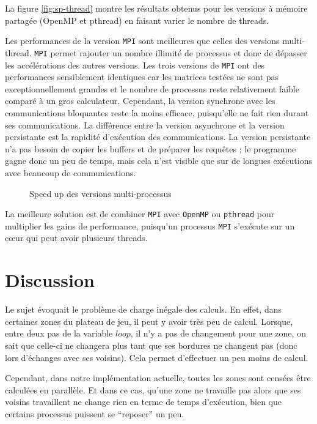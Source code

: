 La figure \ref{fig:sp-thread} montre les résultats obtenus pour les versions à mémoire partagée (OpenMP et pthread) en faisant varier le nombre de threads.


Les performances de la version \texttt{MPI} sont meilleures que celles des versions multi-thread. \texttt{MPI} permet rajouter un nombre illimité de processus et donc de dépasser les accélérations des autres versions. Les trois versions de \texttt{MPI} ont des performances sensiblement identiques car les matrices testées ne sont pas exceptionnellement grandes et le nombre de processus reste relativement faible comparé à un gros calculateur. Cependant, la version synchrone avec les communications bloquantes reste la moins efficace, puisqu'elle ne fait rien durant ses communications. La différence entre la version asynchrone et la version persistante est la rapidité d'exécution des communications. La version persistante n'a pas besoin de copier les buffers et de préparer les requêtes ; le programme gagne donc un peu de temps, mais cela n'est visible que sur de longues exécutions avec beaucoup de communications.

\begin{figure}[!ht]
\centering
\caption{Speed up des versions multi-processus}
\label{fig:sp-proc}
\end{figure}

La meilleure solution est de combiner \texttt{MPI} avec \texttt{OpenMP} ou \texttt{pthread} pour multiplier les gains de performance, puisqu'un processus \texttt{MPI} s'exécute sur un c\oe ur qui peut avoir plusieurs threads.


\section{Discussion} %
\label{sec:discussion}

Le sujet évoquait le problème de charge inégale des calculs. En effet, dans certaines zones du plateau de jeu, il peut y avoir très peu de calcul. Lorsque, entre deux pas de la variable $loop$, il n'y a pas de changement pour une zone, on sait que celle-ci ne changera plus tant que ses bordures ne changent pas (donc lors d'échanges avec ses voisins). Cela permet d'effectuer un peu moins de calcul.

Cependant, dans notre implémentation actuelle, toutes les zones sont censées être calculées en parallèle. Et dans ce cas, qu'une zone ne travaille pas alors que ses voisins travaillent ne change rien en terme de temps d'exécution, bien que certains processus puissent se ``reposer'' un peu. 

